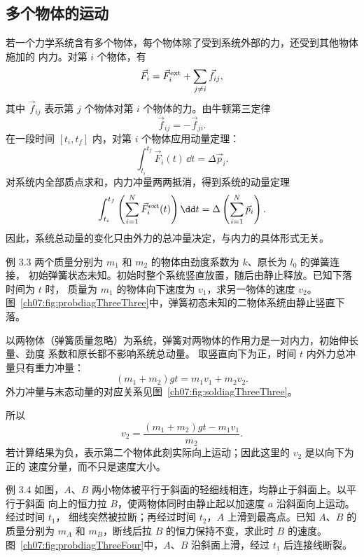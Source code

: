 \subsection{多个物体的运动}

若一个力学系统含有多个物体，每个物体除了受到系统外部的力，还受到其他物体施加的
内力。对第 $i$ 个物体，有
\begin{equation}
 \vec F_i=\vec F_i^{\rm ext}+\sum_{j\ne i}\vec f_{ij},
\end{equation}
其中 $\vec f_{ij}$ 表示第 $j$ 个物体对第 $i$ 个物体的力。由牛顿第三定律
\begin{equation}
 \vec f_{ij}=-\vec f_{ji}.
\end{equation}
在一段时间 $[t_i,t_f]$ 内，对第 $i$ 个物体应用动量定理：
\begin{equation}
 \int_{t_i}^{t_f}\vec F_i(t)\,\dd t=\Delta\vec p_i.
\end{equation}
对系统内全部质点求和，内力冲量两两抵消，得到系统的动量定理
\begin{equation}
 \int_{t_i}^{t_f}\left(\sum_{i=1}^{N}\vec F_i^{\rm ext}(t)\right)\dd t
 =\Delta\left(\sum_{i=1}^{N}\vec p_i\right).
\end{equation}
因此，系统总动量的变化只由外力的总冲量决定，与内力的具体形式无关。

\Needspace{0.27\textheight}
\begin{origexamplebox}{例 3.3}
两个质量分别为 $m_1$ 和 $m_2$ 的物体由劲度系数为 $k$、原长为 $l_0$ 的弹簧连接，
初始弹簧状态未知。初始时整个系统竖直放置，随后由静止释放。已知下落时间为 $t$ 时，
质量为 $m_1$ 的物体向下速度为 $v_1$，求另一物体的速度 $v_2$。
图~\ref{ch07:fig:probdiagThreeThree}中，弹簧初态未知的二物体系统由静止竖直下落。
\probdiagThreeThree
\end{origexamplebox}

\begin{xesolution}
以两物体（弹簧质量忽略）为系统，弹簧对两物体的作用力是一对内力，初始伸长量、劲度
系数和原长都不影响系统总动量。
取竖直向下为正，时间 $t$ 内外力总冲量只有重力冲量：
\[
 (m_1+m_2)gt=m_1v_1+m_2v_2.
\]
外力冲量与末态动量的对应关系见图~\ref{ch07:fig:soldiagThreeThree}。

\soldiagThreeThree
所以
\[
 \boxed{v_2=\frac{(m_1+m_2)gt-m_1v_1}{m_2}}.
\]
若计算结果为负，表示第二个物体此刻实际向上运动；因此这里的 $v_2$ 是以向下为正的
速度分量，而不只是速度大小。
\end{xesolution}

\Needspace{0.31\textheight}
\begin{origexamplebox}{例 3.4}
如图，$A$、$B$ 两小物体被平行于斜面的轻细线相连，均静止于斜面上。以平行于斜面
向上的恒力拉 $B$，使两物体同时由静止起以加速度 $a$ 沿斜面向上运动。经过时间 $t_1$，
细线突然被拉断；再经过时间 $t_2$，$A$ 上滑到最高点。已知 $A$、$B$ 的质量分别为
$m_A$ 和 $m_B$，断线后拉 $B$ 的恒力保持不变，求此时 $B$ 的速度。
图~\ref{ch07:fig:probdiagThreeFour}中，$A$、$B$ 沿斜面上滑，经过 $t_1$ 后连接线断裂。
\probdiagThreeFour
\end{origexamplebox}

